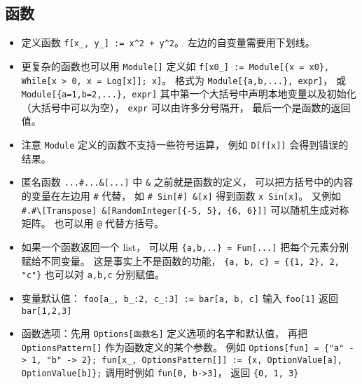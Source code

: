 \subsection{函数}
\begin{itemize}
\item 定义函数 \verb`f[x_, y_] := x^2 + y^2`。 左边的自变量需要用下划线。
\item 更复杂的函数也可以用 \verb`Module[]` 定义如 \verb`f[x0_] := Module[{x = x0}, While[x > 0, x = Log[x]]; x]`。 格式为 \verb`Module[{a,b,...}, expr]`， 或 \verb`Module[{a=1,b=2,...}, expr]` 其中第一个大括号中声明本地变量以及初始化（大括号中可以为空）， \verb`expr` 可以由许多分号隔开， 最后一个是函数的返回值。
\item 注意 \verb`Module` 定义的函数不支持一些符号运算， 例如 \verb`D[f[x]]` 会得到错误的结果。
\item 匿名函数 \verb`...#...&[...]` 中 \verb`&` 之前就是函数的定义， 可以把方括号中的内容的变量在左边用 \verb`#` 代替， 如 \verb`# Sin[#] &[x]` 得到函数 \verb`x Sin[x]`。 又例如 \verb`#.#\[Transpose] &[RandomInteger[{-5, 5}, {6, 6}]]` 可以随机生成对称矩阵。 也可以用 \verb`@` 代替方括号。
\item 如果一个函数返回一个 list， 可以用 \verb`{a,b,..} = Fun[...]` 把每个元素分别赋给不同变量。 这是事实上不是函数的功能， \verb`{a, b, c} = {{1, 2}, 2, "c"}` 也可以对 \verb`a,b,c` 分别赋值。
\item 变量默认值： \verb`foo[a_, b_:2, c_:3] := bar[a, b, c]` 输入 \verb`foo[1]` 返回 \verb`bar[1,2,3]`
\item 函数选项：先用 \verb`Options[函数名]` 定义选项的名字和默认值， 再把 \verb`OptionsPattern[]` 作为函数定义的某个参数。 例如 \verb`Options[fun] = {"a" -> 1, "b" -> 2}; fun[x_, OptionsPattern[]] := {x, OptionValue[a], OptionValue[b]};` 调用时例如 \verb`fun[0, b->3]`， 返回 \verb`{0, 1, 3}`
\end{itemize}


